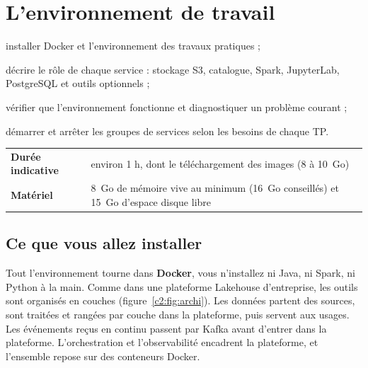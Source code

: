 \chapter[L'environnement de travail]{L'environnement de travail}\label{ch:environnement}

\begin{objectifs}
  \item installer Docker et l'environnement des travaux pratiques ;
  \item décrire le rôle de chaque service : stockage S3, catalogue, Spark, JupyterLab, PostgreSQL et outils optionnels ;
  \item vérifier que l'environnement fonctionne et diagnostiquer un problème courant ;
  \item démarrer et arrêter les groupes de services selon les besoins de chaque TP.
\end{objectifs}

\begin{center}\small\renewcommand{\arraystretch}{1.2}
\begin{tabularx}{\textwidth}{@{}>{\bfseries}l X@{}}
\toprule
Durée indicative & environ 1 h, dont le téléchargement des images (8 à 10~Go) \\
Matériel & 8~Go de mémoire vive au minimum (16~Go conseillés) et 15~Go d'espace disque libre \\
\bottomrule
\end{tabularx}
\end{center}
\section{Ce que vous allez installer}

Tout l'environnement tourne dans \textbf{Docker}, vous n'installez ni Java, ni Spark, ni Python à la main.
Comme dans une plateforme Lakehouse d'entreprise, les outils sont organisés en couches
(figure~\ref{c2:fig:archi}). Les données partent des sources, sont traitées et rangées par couche
dans la plateforme, puis servent aux usages. Les événements reçus en continu passent par Kafka avant
d'entrer dans la plateforme. L'orchestration et l'observabilité encadrent la plateforme, et
l'ensemble repose sur des conteneurs Docker.


